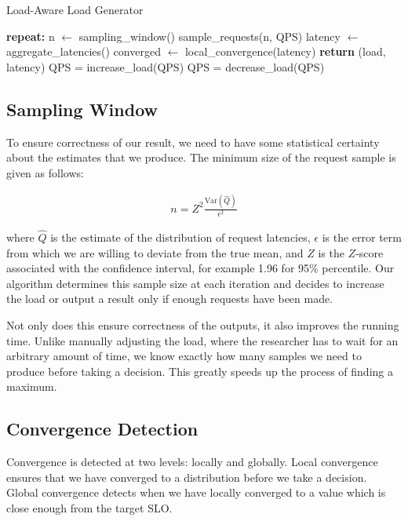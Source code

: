 \documentclass[10pt,conference,compsocconf]{IEEEtran}
\begin{document}
\begin{algorithm}
	\caption{Load-Aware Load Generator}\label{alg:cap}
	\begin{algorithmic}[1]
		\STATE \textbf{repeat:}
		\Indent
		\STATE n $\gets$ sampling\_window()
		\STATE sample\_requests(n, QPS)
		\STATE latency $\gets$ aggregate\_latencies()
		\STATE converged $\gets$ local\_convergence(latency) 
		\STATE \textbf{return} (load, latency)
		\STATE QPS = increase\_load(QPS) 
		\STATE QPS = decrease\_load(QPS)
		\ENDIF
		\ENDIF
		\EndIndent
	\end{algorithmic}
\end{algorithm}


\subsection{Sampling Window}

To ensure correctness of our result, we need to have some statistical certainty about the estimates that we produce. The minimum size of the request sample is given as follows:

\begin{align*}
	n = Z^2\frac{\text{Var}(\hat{Q})}{\epsilon^2}
\end{align*}

where $\hat{Q}$ is the estimate of the distribution of request latencies, $\epsilon$ is the error term from which we are willing to deviate from the true mean, and $Z$ is the $Z$-score associated with the confidence interval, for example 1.96 for 95\% percentile. Our algorithm determines this sample size at each iteration and decides to increase the load or output a result only if enough requests have been made. 

Not only does this ensure correctness of the outputs, it also improves the running time. Unlike manually adjusting the load, where the researcher has to wait for an arbitrary amount of time, we know exactly how many samples we need to produce before taking a decision. This greatly speeds up the process of finding a maximum.

\subsection{Convergence Detection}

Convergence is detected at two levels: locally and globally. Local convergence ensures that we have converged to a distribution before we take a decision. Global convergence detects when we have locally converged to a value which is close enough from the target SLO.
\end{document}
